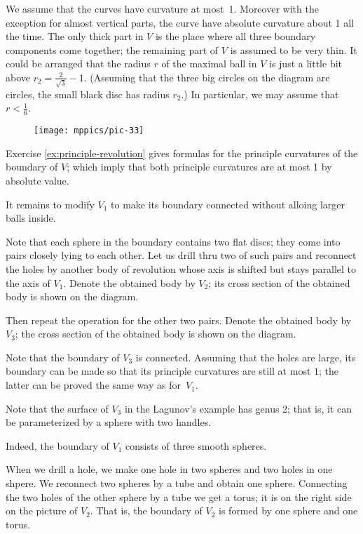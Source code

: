 We assume that the curves have curvature at most~1.
Moreover with the exception for almost vertical parts, the curve have absolute curvature about 1 all the time.
The only thick part in $V$ is the place where all three boundary components come together;
the remaining part of $V$ is assumed to be very thin.
It could be arranged that the radius $r$ of the maximal ball in $V$ is just a little bit above 
$r_2=\tfrac2{\sqrt{3}}-1$.
(Assuming that the three big circles on the diagram are circles, the small black disc has radius $r_2$.)
In particular, we may assume that $r<\tfrac16$.

\begin{figure}[h!]
\centering
\texttt{[image: mppics/pic-33]}
\vskip0mm
\end{figure}

Exercise \ref{ex:principle-revolution} gives formulas for the principle curvatures of the boundary of $V$;
which imply that both principle curvatures are at most 1 by absolute value.  

It remains to modify $V_1$ to make its boundary connected without  alloing larger balls inside.

Note that each sphere in the boundary contains two flat discs;
they come into pairs closely lying to each other. 
Let us drill thru two of such pairs and reconnect the holes by another body of revolution whose 
axis is shifted but stays parallel to the axis of $V_1$.
Denote the obtained body by $V_2$; its cross section of the obtained body is shown on the diagram. 

Then repeat the operation for the other two pairs.
Denote the obtained body by $V_3$; the cross section of the obtained body is shown on the diagram.

Note that the boundary of $V_3$ is connected.
Assuming that the holes are large, its boundary can be made so that its principle curvatures are still at most $1$; the latter can be proved the same way as for~$V_1$.
\qeds


Note that the surface of $V_3$ in the Lagunov's example has genus 2;
that is, it can be parameterized by a sphere with two handles.

Indeed, the boundary of $V_1$ consists of three smooth spheres.

When we drill a hole, we make one hole in two spheres and two holes in one shpere.
We reconnect two spheres by a tube and obtain one sphere.
Connecting the two holes of the other sphere by a tube we get a torus;
it is on the right side on the picture of $V_2$.
That is, the boundary of $V_2$ is formed by one sphere and one torus.

